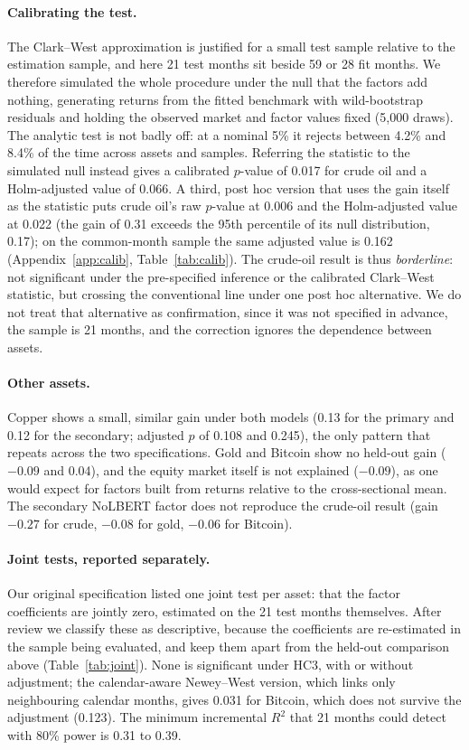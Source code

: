 \documentclass[11pt]{article}
\begin{document}
\paragraph{Calibrating the test.} The Clark--West approximation is justified for a small test sample relative to the estimation sample, and here 21 test months sit beside 59 or 28 fit months. We therefore simulated the whole procedure under the null that the factors add nothing, generating returns from the fitted benchmark with wild-bootstrap residuals and holding the observed market and factor values fixed (5{,}000 draws). The analytic test is not badly off: at a nominal 5\% it rejects between 4.2\% and 8.4\% of the time across assets and samples. Referring the statistic to the simulated null instead gives a calibrated $p$-value of 0.017 for crude oil and a Holm-adjusted value of 0.066. A third, post hoc version that uses the gain itself as the statistic puts crude oil's raw $p$-value at 0.006 and the Holm-adjusted value at 0.022 (the gain of 0.31 exceeds the 95th percentile of its null distribution, 0.17); on the common-month sample the same adjusted value is 0.162 (Appendix~\ref{app:calib}, Table~\ref{tab:calib}). The crude-oil result is thus \emph{borderline}: not significant under the pre-specified inference or the calibrated Clark--West statistic, but crossing the conventional line under one post hoc alternative. We do not treat that alternative as confirmation, since it was not specified in advance, the sample is 21 months, and the correction ignores the dependence between assets.

\paragraph{Other assets.} Copper shows a small, similar gain under both models (0.13 for the primary and 0.12 for the secondary; adjusted $p$ of 0.108 and 0.245), the only pattern that repeats across the two specifications. Gold and Bitcoin show no held-out gain ($-0.09$ and 0.04), and the equity market itself is not explained ($-0.09$), as one would expect for factors built from returns relative to the cross-sectional mean. The secondary NoLBERT factor does not reproduce the crude-oil result (gain $-0.27$ for crude, $-0.08$ for gold, $-0.06$ for Bitcoin).

\paragraph{Joint tests, reported separately.} Our original specification listed one joint test per asset: that the factor coefficients are jointly zero, estimated on the 21 test months themselves. After review we classify these as descriptive, because the coefficients are re-estimated in the sample being evaluated, and keep them apart from the held-out comparison above (Table~\ref{tab:joint}). None is significant under HC3, with or without adjustment; the calendar-aware Newey--West version, which links only neighbouring calendar months, gives 0.031 for Bitcoin, which does not survive the adjustment (0.123). The minimum incremental $R^2$ that 21 months could detect with 80\% power is 0.31 to 0.39.
\end{document}
